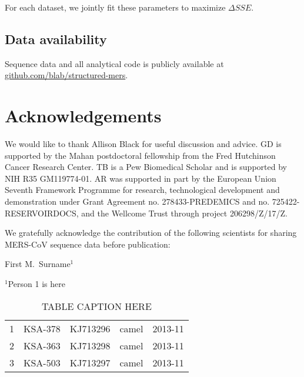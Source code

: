\documentclass[11pt,oneside,letterpaper]{article}
\begin{document}
For each dataset, we jointly fit these parameters to maximize $\Delta SSE$.

\subsection*{Data availability}
Sequence data and all analytical code is publicly available at \href{https://github.com/blab/structured-mers}{github.com/blab/structured-mers}.

\section*{Acknowledgements}
We would like to thank Allison Black for useful discussion and advice.
GD is supported by the Mahan postdoctoral fellowship from the Fred Hutchinson Cancer Research Center.
TB is a Pew Biomedical Scholar and is supported by NIH R35 GM119774-01.
AR was supported in part by the European Union Seventh Framework Programme for research, technological development and demonstration under Grant Agreement no. 278433-PREDEMICS and no. 725422-RESERVOIRDOCS, and the Wellcome Trust through project 206298/Z/17/Z.

We gratefully acknowledge the contribution of the following scientists for sharing MERS-CoV sequence data before publication:

First M.\ Surname$^{1}$

$^{1}$Person 1 is here \\

% 
% 

\newpage


\setcounter{figure}{0}
\setcounter{table}{0}
\renewcommand{\thefigure}{S\arabic{figure}}
\renewcommand{\thetable}{S\arabic{table}}

\begin{longtable}{ | r | l | p{2cm} | l | l | } %

  \caption{TABLE CAPTION HERE} \label{TABLE LABEL HERE} \\
  \endfirsthead

  1 & KSA-378 & KJ713296 & camel & 2013-11 \\
  2 & KSA-363 & KJ713298 & camel & 2013-11 \\
  3 & KSA-503 & KJ713297 & camel & 2013-11 \\

\end{longtable}
\end{document}
